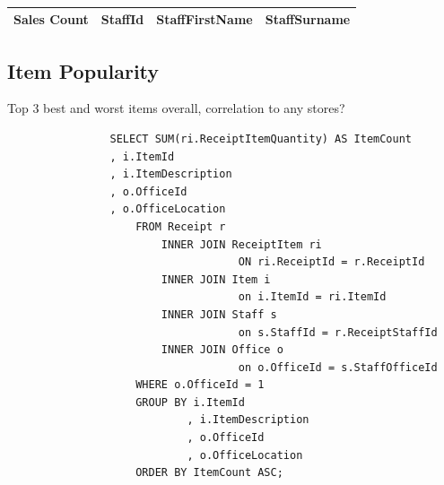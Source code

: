 \documentclass{article}
\begin{document}
            \begin{lstlisting}
                
            \end{lstlisting}

            \begin{table}[H]
                \centering
                \begin{tabular}{|l|l|l|l|}
                \hline
                Sales Count & StaffId & StaffFirstName & StaffSurname \\ \hline
                \end{tabular}
                \end{table}

            \subsection{Item Popularity}
            Top 3 best and worst items overall, correlation to any stores?

            \begin{lstlisting}
                SELECT SUM(ri.ReceiptItemQuantity) AS ItemCount
                , i.ItemId
                , i.ItemDescription
                , o.OfficeId
                , o.OfficeLocation
                    FROM Receipt r
                        INNER JOIN ReceiptItem ri
                                    ON ri.ReceiptId = r.ReceiptId
                        INNER JOIN Item i
                                    on i.ItemId = ri.ItemId
                        INNER JOIN Staff s
                                    on s.StaffId = r.ReceiptStaffId
                        INNER JOIN Office o
                                    on o.OfficeId = s.StaffOfficeId
                    WHERE o.OfficeId = 1
                    GROUP BY i.ItemId
                            , i.ItemDescription
                            , o.OfficeId
                            , o.OfficeLocation
                    ORDER BY ItemCount ASC;
            \end{lstlisting}
\end{document}
